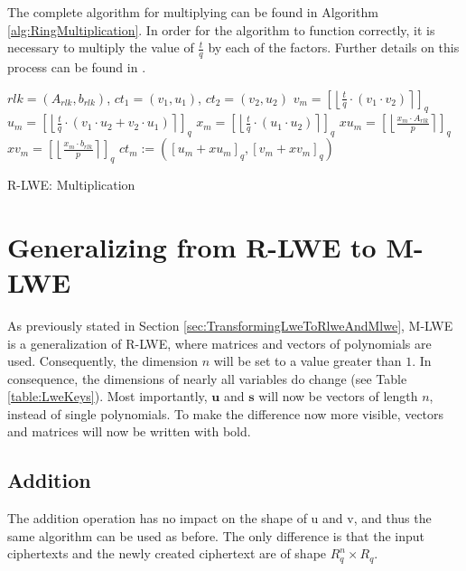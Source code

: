 The complete algorithm for multiplying can be found in Algorithm \ref{alg:RingMultiplication}. In order for the algorithm to function correctly, it is necessary to multiply the value of $\frac{t}{q}$ by each of the factors. Further details on this process can be found in \cite{bfv}.

\begin{algorithm}[htb]
  \begin{algorithmic}[1]
    \REQUIRE $rlk=(A_{rlk}, b_{rlk})$, $ct_1 = (v_1, u_1)$, $ct_2 = (v_2, u_2)$
    \STATE $v_m = \left[\left\lfloor \frac{t}{q}\cdot (v_1 \cdot v_2)\right\rceil\right] _q $
    \STATE $u_m = \left[\left\lfloor \frac{t}{q}\cdot(v_1 \cdot u_2 + v_2 \cdot u_1)\right\rceil\right] _q$
    \STATE $x_m = \left[\left\lfloor \frac{t}{q}\cdot(u_1 \cdot u_2)\right\rceil\right] _q$
    \STATE $xu_m = \left[\left\lfloor \frac{x_m \cdot A_{rlk}}{p}  \right\rceil \right]_q$
    \STATE $xv_m = \left[\left\lfloor \frac{x_m \cdot b_{rlk}}{p}  \right\rceil \right]_q$
    \RETURN $ct_m:=(\left[u_m + xu_m\right]_q , \left[v_m + xv_m\right]_q )$
  \end{algorithmic}
  \caption{R-LWE: Multiplication}
  \label{alg:RingMultiplication}
\end{algorithm}

\section{Generalizing from R-LWE to M-LWE}

As previously stated in Section \ref{sec:TransformingLweToRlweAndMlwe}, M-LWE is a generalization of R-LWE, where matrices and vectors of polynomials are used. Consequently, the dimension $n$ will be set to a value greater than $1$. In consequence, the dimensions of nearly all variables do change (see Table \ref{table:LweKeys}). Most importantly, $\textbf{u}$ and $\textbf{s}$ will now be vectors of length $n$, instead of single polynomials. To make the difference now more visible, vectors and matrices will now be written with bold.

\subsection*{Addition}

The addition operation has no impact on the shape of u and v, and thus the same algorithm can be used as before. The only difference is that the input ciphertexts and the newly created ciphertext are of shape $R_q^{n}\times R_q$.

